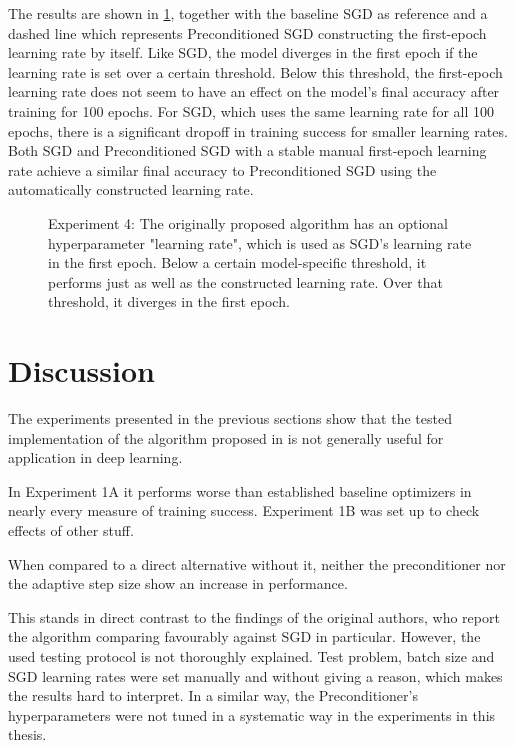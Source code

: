 \documentclass[twoside,12pt,a4paper]{report}
\begin{document}
The results are shown in \ref{fig:exp_lr_sens}, together with the baseline SGD as reference and a dashed line which represents Preconditioned SGD constructing the first-epoch learning rate by itself.
Like SGD, the model diverges in the first epoch if the learning rate is set over a certain threshold. Below this threshold, the first-epoch learning rate does not seem to have an effect on the model's final accuracy after training for 100 epochs. 
For SGD, which uses the same learning rate for all 100 epochs, there is a significant dropoff in training success for smaller learning rates.
Both SGD and Preconditioned SGD with a stable manual first-epoch learning rate achieve a similar final accuracy to Preconditioned SGD using the automatically constructed learning rate. 

\begin{figure}
	\centering \hspace{-1,5cm}
	
	\caption{Experiment 4: The originally proposed algorithm has an optional hyperparameter "learning rate", which is used as SGD's learning rate in the first epoch. Below a certain model-specific threshold, it performs just as well as the constructed learning rate. Over that threshold, it diverges in the first epoch.}
	\label{fig:exp_lr_sens}
\end{figure}



\section{Discussion} %
The experiments presented in the previous sections show that the tested implementation of the algorithm proposed in \cite{roos2019active} is not generally useful for application in deep learning.

In Experiment 1A it performs worse than established baseline optimizers in nearly every measure of training success.
Experiment 1B was set up to check effects of other stuff.

When compared to a direct alternative without it, neither the preconditioner nor the adaptive step size show an increase in performance.

This stands in direct contrast to the findings of the original authors, who report the algorithm comparing favourably against SGD in particular. However, the used testing protocol is not thoroughly explained. Test problem, batch size and SGD learning rates were set manually and without giving a reason, which makes the results hard to interpret. In a similar way, the Preconditioner's hyperparameters were not tuned in a systematic way in the experiments in this thesis.
\end{document}
